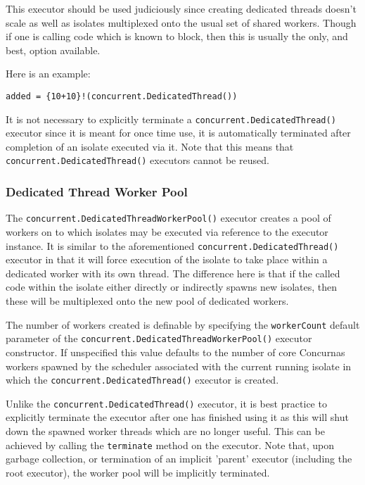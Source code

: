 \documentclass[conc-doc]{subfiles}
\begin{document}
This executor should be used judiciously since creating dedicated threads doesn't scale as well as isolates multiplexed onto the usual set of shared workers. Though if one is calling code which is known to block, then this is usually the only, and best, option available.

Here is an example:

\begin{lstlisting}
added = {10+10}!(concurrent.DedicatedThread())
\end{lstlisting}

It is not necessary to explicitly terminate a \lstinline{concurrent.DedicatedThread()} executor since it is meant for once time use, it is automatically terminated after completion of an isolate executed via it. Note that this means that \lstinline{concurrent.DedicatedThread()} executors cannot be reused.


\subsubsection{Dedicated Thread Worker Pool}
The \lstinline{concurrent.DedicatedThreadWorkerPool()} executor creates a pool of workers on to which isolates may be executed via  reference to the executor instance. It is similar to the aforementioned \lstinline{concurrent.DedicatedThread()} executor in that it will force execution of the isolate to take place within a dedicated worker with its own thread. The difference here is that if the called code within the isolate either directly or indirectly spawns new isolates, then these will be multiplexed onto the new pool of dedicated workers.

The number of workers created is definable by specifying the \lstinline{workerCount} default parameter of the \lstinline{concurrent.DedicatedThreadWorkerPool()} executor constructor. If unspecified this value defaults to the number of core Concurnas workers spawned by the scheduler associated with the current running isolate in which the \lstinline{concurrent.DedicatedThread()} executor is created.

Unlike the \lstinline{concurrent.DedicatedThread()} executor, it is best practice to explicitly terminate the executor after one has finished using it as this will shut down the spawned worker threads which are no longer useful. This can be achieved by calling the \lstinline{terminate} method on the executor. Note that, upon garbage collection, or termination of an implicit 'parent' executor (including the root executor), the worker pool will be implicitly terminated.
\end{document}
